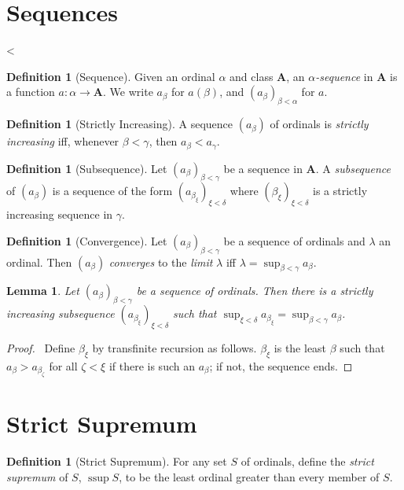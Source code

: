 \documentclass{book}
\let\qed\relax
\newtheorem{lm}[ax]{Lemma}
\theoremstyle{definition}
\newtheorem{df}[ax]{Definition}
\newcommand{\ssup}{\ensuremath{\operatorname{ssup}}}
\begin{document}
\section{Sequences}
<
\begin{df}[Sequence]
Given an ordinal $\alpha$ and class $\mathbf{A}$, an \emph{$\alpha$-sequence} in $\mathbf{A}$ is a function $a : \alpha \rightarrow \mathbf{A}$. We write $a_\beta$ for $a(\beta)$, and $(a_\beta)_{\beta < \alpha}$ for $a$.
\end{df}

\begin{df}[Strictly Increasing]
A sequence $(a_\beta)$ of ordinals is \emph{strictly increasing} iff, whenever $\beta < \gamma$, then $a_\beta < a_\gamma$.
\end{df}

\begin{df}[Subsequence]
Let $(a_\beta)_{\beta < \gamma}$ be a sequence in $\mathbf{A}$. A \emph{subsequence} of $(a_\beta)$ is a sequence of the form $(a_{\beta_\xi})_{\xi < \delta}$ where $(\beta_\xi)_{\xi < \delta}$ is a strictly increasing sequence in $\gamma$.
\end{df}

\begin{df}[Convergence]
Let $(a_\beta)_{\beta < \gamma}$ be a sequence of ordinals and $\lambda$ an ordinal. Then $(a_\beta)$ \emph{converges} to the \emph{limit} $\lambda$ iff $\lambda = \sup_{\beta < \gamma} a_\beta$.
\end{df}

\begin{lm}
\label{lm:convergentsubsequence}
Let $(a_\beta)_{\beta < \gamma}$ be a sequence of ordinals. Then there is a strictly increasing subsequence $(a_{\beta_\xi})_{\xi < \delta}$ such that $\sup_{\xi < \delta} a_{\beta_\xi} = \sup_{\beta < \gamma} a_\beta$.
\end{lm}

\begin{proof}
\pf\ Define $\beta_\xi$ by transfinite recursion as follows. $\beta_\xi$ is the least $\beta$ such that $a_\beta > a_{\beta_\zeta}$ for all $\zeta < \xi$ if there is such an $a_\beta$; if not, the sequence ends.
\qed
\end{proof}

\section{Strict Supremum}

\begin{df}[Strict Supremum]
For any set $S$ of ordinals, define the \emph{strict supremum} of $S$, $\ssup S$, to be the least ordinal greater than every member of $S$.
\end{df}
\end{document}
